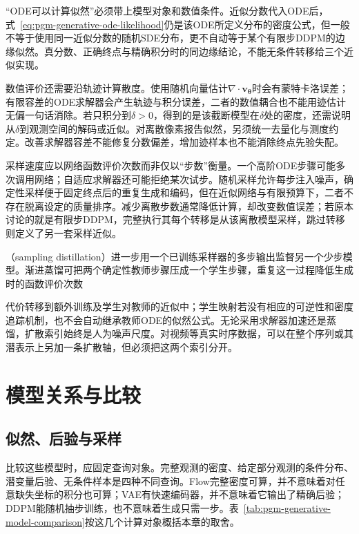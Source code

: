 “ODE可以计算似然”必须带上模型对象和数值条件。近似分数代入ODE后，式~\eqref{eq:pgm-generative-ode-likelihood}仍是该ODE所定义分布的密度公式，但一般不等于使用同一近似分数的随机SDE分布，更不自动等于某个有限步DDPM的边缘似然。真分数、正确终点与精确积分时的同边缘结论，不能无条件转移给三个近似实现。

数值评价还需要沿轨迹计算散度。使用随机向量估计$\nabla\cdot\bm{v}_{\bm{\theta}}$时会有蒙特卡洛误差；有限容差的ODE求解器会产生轨迹与积分误差，二者的数值耦合也不能用迹估计无偏一句话消除。若只积分到$\delta>0$，得到的是该截断模型在$\delta$处的密度，还需说明从$\delta$到观测空间的解码或近似。对离散像素报告似然，另须统一去量化与测度约定。改善求解器容差不能修复分数偏差，增加迹样本也不能消除终点先验失配。

采样速度应以网络函数评价次数而非仅以“步数”衡量。一个高阶ODE步骤可能多次调用网络；自适应求解器还可能拒绝某次试步。随机采样允许每步注入噪声，确定性采样便于固定终点后的重复生成和编码，但在近似网络与有限预算下，二者不存在脱离设定的质量排序。减少离散步数通常降低计算，却改变数值误差；若原本讨论的就是有限步DDPM，完整执行其每个转移是从该离散模型采样，跳过转移则定义了另一套采样近似。

（sampling distillation）进一步用一个已训练采样器的多步输出监督另一个少步模型。渐进蒸馏可把两个确定性教师步骤压成一个学生步骤，重复这一过程降低生成时的函数评价次数

代价转移到额外训练及学生对教师的近似中；学生映射若没有相应的可逆性和密度追踪机制，也不会自动继承教师ODE的似然公式。无论采用求解器加速还是蒸馏，扩散索引始终是人为噪声尺度。对视频等真实时序数据，可以在整个序列或其潜表示上另加一条扩散轴，但必须把这两个索引分开。

\section{模型关系与比较}
\label{sec:pgm-generative-comparison}

\subsection{似然、后验与采样}
\label{sec:pgm-generative-likelihood-posterior-sampling}

比较这些模型时，应固定查询对象。完整观测的密度、给定部分观测的条件分布、潜变量后验、无条件样本是四种不同查询。Flow完整密度可算，并不意味着对任意缺失坐标的积分也可算；VAE有快速编码器，并不意味着它输出了精确后验；DDPM能随机抽步训练，也不意味着生成只需一步。表~\ref{tab:pgm-generative-model-comparison}按这几个计算对象概括本章的取舍。

